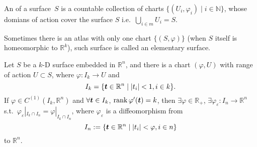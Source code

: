 \documentclass[openany]{book}
\DeclareMathOperator{\rank}{rank}
\begin{document}
\begin{definition}[Atlas]
	An  of a surface~$S$ is a countable collection of charts $\{(U_i, \varphi_i) \mid i \in \mathbb N\}$, whose domians of action cover the surface $S$ i.e.\ $\bigcup_{i \in m} U_i = S$.
\end{definition}

Sometimes there is an atlas with only one chart $\{(S, \varphi)\}$ (when $S$ itself is homeomorphic to $\mathbb R^k$), such surface is called an elementary surface.

\begin{theorem}
	Let $S$ be a $k$-D surface embedded in $\mathbb R^n$, and there is a chart $(\varphi, U)$ with range of action $U \subset S$, where $\varphi \colon I_k \to U$ and
	\begin{equation*}
		I_k = \{ \boldsymbol{t} \in \mathbb R^n \mid |t_i| < 1, i \in k \}.
	\end{equation*} 
	If $\varphi \in C^{(1)}(I_k, \mathbb R^n)$ and $\forall \boldsymbol{t} \in I_k$, $\rank \varphi'(\bv t) = k$, then $\exists \varphi \in \mathbb R_+$, $\exists \varphi_\varepsilon \colon I_n \to \mathbb R^n$ s.t.\ $\varphi_\varepsilon |_{I_k \cap I_n} = \varphi |_{I_k \cap I_n}$, where $\varphi_\varepsilon$ is a diffeomorphism from
	\begin{equation*}
		I_n := \{\boldsymbol{t} \in \mathbb R^n \mid |t_i| < \varphi, i \in n\}
	\end{equation*}
	to $\mathbb R^n$.
\end{theorem}
\end{document}

